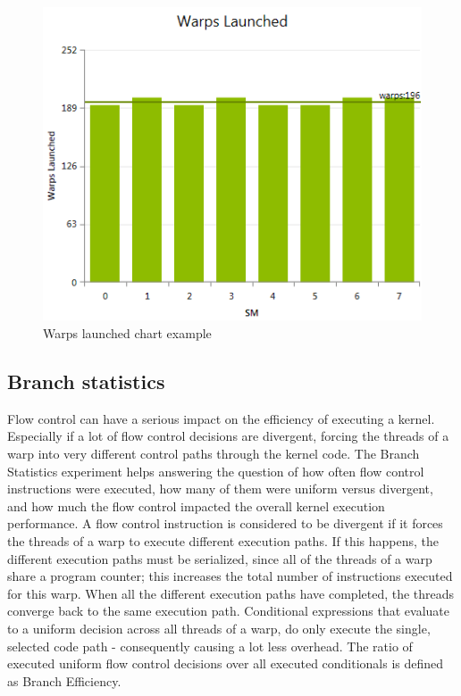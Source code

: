 \documentclass[oneside,openright,12pt,final,en]{mgr}
\begin{document}
\begin{itemize}
	\begin{figure}[h!]
		\centering
		\includegraphics{InstructionStatisticsChartWarpsLaunched}
		\caption{Warps launched chart example}
	\end{figure}	
\end{itemize}

\subsection{Branch statistics}

Flow control can have a serious impact on the efficiency of executing a kernel. Especially if a lot of flow control decisions are divergent, forcing the threads of a warp into very different control paths through the kernel code. The Branch Statistics experiment helps answering the question of how often flow control instructions were executed, how many of them were uniform versus divergent, and how much the flow control impacted the overall kernel execution performance.
A flow control instruction is considered to be divergent if it forces the threads of a warp to execute different execution paths. If this happens, the different execution paths must be serialized, since all of the threads of a warp share a program counter; this increases the total number of instructions executed for this warp. When all the different execution paths have completed, the threads converge back to the same execution path. Conditional expressions that evaluate to a uniform decision across all threads of a warp, do only execute the single, selected code path - consequently causing a lot less overhead. The ratio of executed uniform flow control decisions over all executed conditionals is defined as Branch Efficiency.
\end{document}

